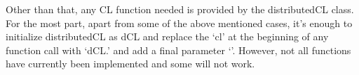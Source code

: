 \documentclass[../thesis.tex]{subfiles}
\begin{document}
    Other than that, any CL function needed is provided by the distributedCL class. For the most part, apart from some of the above mentioned cases, it's enough to initialize distributedCL as dCL and replace the `cl' at the beginning of any function call with `dCL.' and add a final parameter `{}'. However, not all functions have currently been implemented and some will not work.

\end{document}
